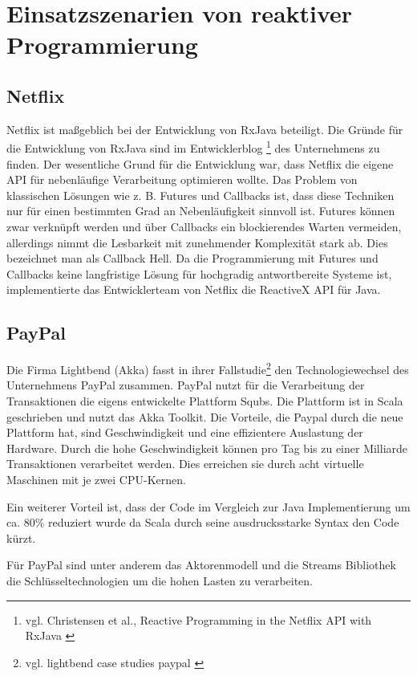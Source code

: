 \chapter{Einsatzszenarien von reaktiver Programmierung}
\label{chap:scenario}
\section{Netflix}
Netflix ist maßgeblich bei der Entwicklung von RxJava beteiligt. Die Gründe für die Entwicklung von RxJava sind im Entwicklerblog \footnote{vgl. Christensen et al., Reactive Programming in the Netflix API with RxJava \cite{web:site:medium:netflix:reactive_programming}} des Unternehmens zu finden. Der wesentliche Grund für die Entwicklung war, dass Netflix die eigene API für nebenläufige Verarbeitung optimieren wollte. Das Problem von klassischen Lösungen wie z. B. Futures und Callbacks ist, dass diese Techniken nur für einen bestimmten Grad an Nebenläufigkeit sinnvoll ist. Futures können zwar verknüpft werden und über Callbacks ein blockierendes Warten vermeiden, allerdings nimmt die Lesbarkeit mit zunehmender Komplexität stark ab. Dies bezeichnet man als Callback Hell. Da die Programmierung mit Futures und Callbacks keine langfristige Lösung für hochgradig antwortbereite Systeme ist, implementierte das Entwicklerteam von Netflix die ReactiveX API für Java. 

\section{PayPal}
Die Firma Lightbend (Akka) fasst in ihrer Fallstudie\footnote{vgl. lightbend case studies paypal \cite{web:site:lightbend:case-studies:paypal}} den Technologiewechsel des Unternehmens PayPal zusammen.
PayPal nutzt für die Verarbeitung der Transaktionen die eigens entwickelte Plattform Squbs. Die Plattform ist in Scala geschrieben und nutzt das Akka Toolkit. Die Vorteile, die Paypal durch die neue Plattform hat, sind Geschwindigkeit und eine effizientere Auslastung der Hardware. Durch die hohe Geschwindigkeit können pro Tag bis zu einer Milliarde Transaktionen verarbeitet werden. Dies erreichen sie durch acht virtuelle Maschinen mit je zwei CPU-Kernen.

Ein weiterer Vorteil ist, dass der Code im Vergleich zur Java Implementierung um ca. 80\% reduziert wurde da Scala durch seine ausdrucksstarke Syntax den Code kürzt.

Für PayPal sind unter anderem das Aktorenmodell und die Streams Bibliothek die Schlüsseltechnologien um die hohen Lasten zu verarbeiten.

